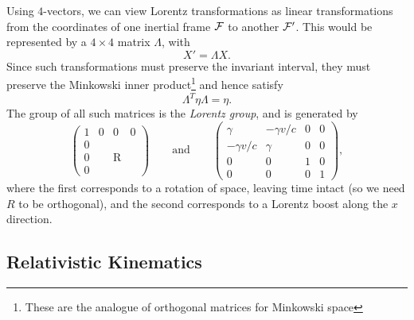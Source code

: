\documentclass{scrartcl}
\theoremstyle{definition}
\begin{document}
Using $4$-vectors, we can view Lorentz transformations as linear transformations from the coordinates of one inertial frame $\mathcal{F}$ to another $\mathcal{F}'$. This would be represented by a $4 \times 4$ matrix $\Lambda$, with
$$
X' = \Lambda X.
$$
Since such transformations must preserve the invariant interval, they must preserve the Minkowski inner product\footnote{These are the analogue of orthogonal matrices for Minkowski space} and hence satisfy
$$
\Lambda^T \eta \Lambda = \eta.
$$
The group of all such matrices is the \emph{Lorentz group}, and is generated by 
$$
\left(\begin{array}{c|ccc}
	1 & 0 & 0 & 0 \\
	\hline 0 & & & \\
	0 & & \mathrm{R} & \\
	0 & & &
	\end{array}\right) 
	\quad \quad \text{and} \quad \quad \left(\begin{array}{cc|cc}
		\gamma & -\gamma v / c & 0 & 0 \\
		-\gamma v / c & \gamma & 0 & 0 \\
		\hline 0 & 0 & 1 & 0 \\
		0 & 0 & 0 & 1
		\end{array}\right),
$$
where the first corresponds to a rotation of space, leaving time intact (so we need $R$ to be orthogonal), and the second corresponds to a Lorentz boost along the $x$ direction.

\subsection*{Relativistic Kinematics}
\end{document}
